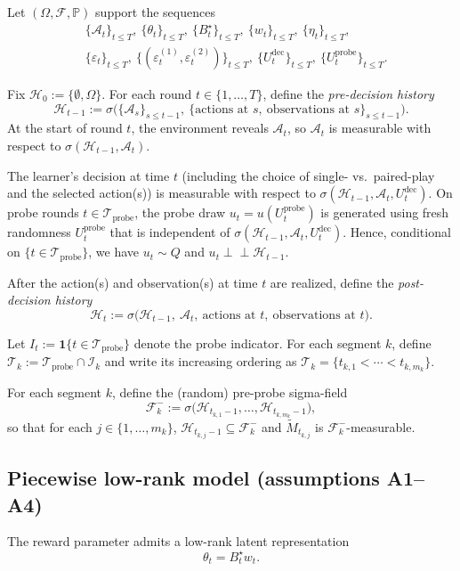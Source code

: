 \documentclass[12pt]{article}
\newcommand{\Prob}{\mathbb{P}}
\newcommand{\cA}{\mathcal{A}}
\newcommand{\cF}{\mathcal{F}}
\newcommand{\cH}{\mathcal{H}}
\newcommand{\cT}{\mathcal{T}}
\newcommand{\cI}{\mathcal{I}}
\newcommand{\cTprobe}{\mathcal{T}_{\mathrm{probe}}}
\theoremstyle{plain}
\theoremstyle{definition}
\begin{document}
Let $(\Omega, \cF, \Prob)$ support the sequences
\[
\begin{aligned}
&\{\cA_t\}_{t \le T},\ \{\theta_t\}_{t \le T},\ \{B_t^\star\}_{t \le T},\ \{w_t\}_{t \le T},\ \{\eta_t\}_{t \le T},\\
&\{\varepsilon_t\}_{t \le T},\ \{(\varepsilon_t^{(1)}, \varepsilon_t^{(2)})\}_{t \le T},\ \{U_t^{\mathrm{dec}}\}_{t \le T},\ \{U_t^{\mathrm{probe}}\}_{t \le T}.
\end{aligned}
\]

Fix $\cH_0 := \{\emptyset, \Omega\}$. For each round $t \in \{1, \dots, T\}$, define the \emph{pre-decision history}
\[
\cH_{t-1}
:=
\sigma\!\Big(
\{\cA_s\}_{s \le t-1},\
\{\text{actions at } s,\ \text{observations at } s\}_{s \le t-1}
\Big).
\]
At the start of round $t$, the environment reveals $\cA_t$, so $\cA_t$ is measurable with respect to $\sigma(\cH_{t-1}, \cA_t)$.

The learner's decision at time $t$ (including the choice of single- vs.\ paired-play and the selected action(s)) is measurable with respect to $\sigma(\cH_{t-1}, \cA_t, U_t^{\mathrm{dec}})$. On probe rounds $t \in \cTprobe$, the probe draw $u_t = u(U_t^{\mathrm{probe}})$ is generated using fresh randomness $U_t^{\mathrm{probe}}$ that is independent of $\sigma(\cH_{t-1}, \cA_t, U_t^{\mathrm{dec}})$. Hence, conditional on $\{t \in \cTprobe\}$, we have $u_t \sim Q$ and $u_t \perp\!\!\!\perp \cH_{t-1}$.

After the action(s) and observation(s) at time $t$ are realized, define the \emph{post-decision history}
\[
\cH_t
:=
\sigma\!\Big(
\cH_{t-1},\ \cA_t,\ \text{actions at } t,\ \text{observations at } t
\Big).
\]

Let $I_t := \mathbf{1}\{t \in \cTprobe\}$ denote the probe indicator. For each segment $k$, define $\cT_k := \cTprobe \cap \cI_k$ and write its increasing ordering as $\cT_k = \{t_{k,1} < \cdots < t_{k,m_k}\}$.

For each segment $k$, define the (random) pre-probe sigma-field
\[
\cF_k^- := \sigma\!\big(\cH_{t_{k,1}-1}, \dots, \cH_{t_{k,m_k}-1}\big),
\]
so that for each $j \in \{1, \dots, m_k\}$, $\cH_{t_{k,j}-1} \subseteq \cF_k^-$ and $\widetilde{M}_{t_{k,j}}$ is $\cF_k^-$-measurable.

\subsection{Piecewise low-rank model (assumptions A1--A4)}

The reward parameter admits a low-rank latent representation
\begin{equation}
\theta_t = B_t^\star w_t.
\label{eq:latent_factor_model}
\end{equation}
\end{document}
